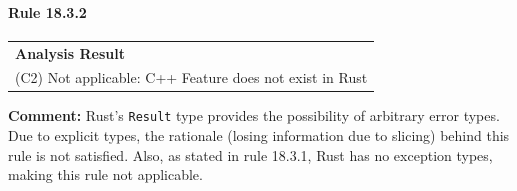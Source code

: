 \paragraph{Rule 18.3.2}
\begin{longtable}{p{13cm}}
\textbf{Analysis Result} \\
(C2) Not applicable: C++ Feature does not exist in Rust \\
\end{longtable}
\textbf{Comment:} Rust's \texttt{Result} type provides the possibility of arbitrary error types. Due to explicit types, the rationale (losing information due to slicing) behind this rule is not satisfied. Also, as stated in rule 18.3.1, Rust has no exception types, making this rule not applicable. \\
